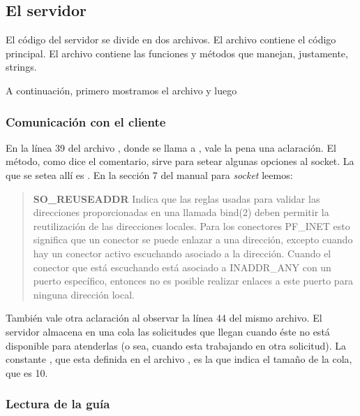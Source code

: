 \subsection{El servidor}

El código del servidor se divide en dos archivos. El archivo
 contiene el código principal. El archivo
 contiene las funciones y métodos que manejan, justamente,
strings.

A continuación, primero mostramos el archivo  y luego



\subsubsection{Comunicación con el cliente}

En la línea 39 del archivo , donde se llama a
, vale la pena una aclaración. El método, como dice el
comentario, sirve para setear algunas opciones al socket. La que se setea allí
es . En la sección 7 del manual para \emph{socket}
leemos:

\begin{quote}

\textbf{SO\_REUSEADDR}\linebreak
Indica que las reglas usadas para validar las direcciones proporcionadas en una
llamada bind(2) deben permitir la reutilización  de  las direcciones  locales.
Para  los conectores PF\_INET esto significa que un conector se puede enlazar a
una dirección, excepto cuando hay un conector activo escuchando asociado a la
dirección. Cuando el conector que está escuchando está asociado a INADDR\_ANY
con un puerto específico, entonces no es posible realizar enlaces a este puerto
para ninguna dirección local.

\end{quote}

También vale otra aclaración al observar la línea 44 del mismo archivo. El
servidor almacena en una cola las solicitudes que llegan cuando éste no está
disponible para atenderlas (o sea, cuando esta trabajando en otra solicitud).
La constante , que esta definida en el archivo
, es la que indica el tamaño de la cola, que es 10.

\subsubsection{Lectura de la guía}

